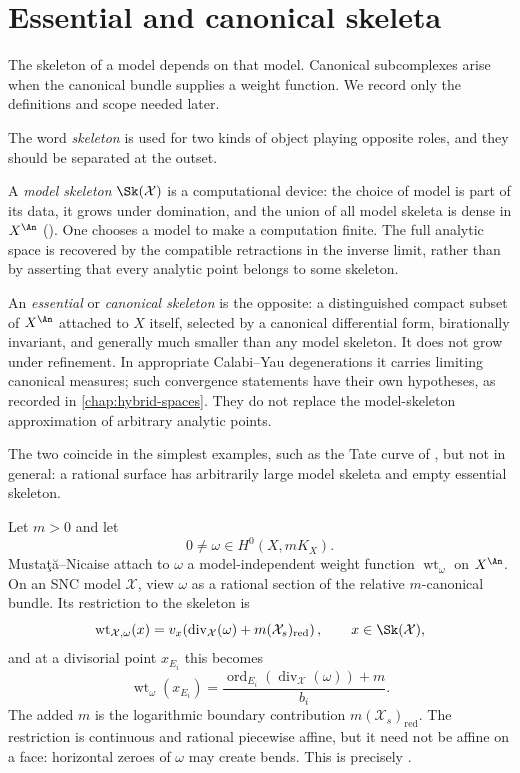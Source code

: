 \section{Essential and canonical skeleta}
\label{sec:essential-skeleton}

The skeleton of a model depends on that model. Canonical subcomplexes arise
when the canonical bundle supplies a weight function. We record only the
definitions and scope needed later.

The word \emph{skeleton} is used for two kinds of object playing opposite
roles, and they should be separated at the outset.

A \emph{model skeleton} $\Sk(\mathcal X)$ is a computational device:
the choice of model is part of its data, it grows under domination, and
the union of all model skeleta is dense in $X^{\An}$
(). One chooses a model to make a
computation finite. The full analytic space is recovered by the compatible
retractions in the inverse limit, rather than by asserting that every
analytic point belongs to some skeleton.

An \emph{essential} or \emph{canonical skeleton} is the opposite: a
distinguished compact subset of $X^{\An}$ attached to $X$ itself,
selected by a canonical differential form, birationally invariant, and
generally much smaller than any model skeleton. It does not grow under
refinement. In appropriate Calabi--Yau degenerations it carries limiting
canonical measures; such convergence statements have their own hypotheses,
as recorded in \cref{chap:hybrid-spaces}. They do not replace the
model-skeleton approximation of arbitrary analytic points.

The two coincide in the simplest examples, such as the Tate curve of
, but not in general: a rational surface has
arbitrarily large model skeleta and empty essential skeleton.

Let $m>0$ and let
\[
              0\neq\omega\in H^0(X,mK_X).
\]
Musta\c{t}\u{a}--Nicaise attach to $\omega$ a model-independent weight
function $\operatorname{wt}_\omega$ on $X^{\An}$.  On an SNC model
$\mathcal X$, view $\omega$ as a rational section of the relative
$m$-canonical bundle.  Its restriction to the skeleton is
\[
 \operatorname{wt}_{\mathcal X,\omega}(x)
 =v_x\!\left(\operatorname{div}_{\mathcal X}(\omega)
              +m(\mathcal X_s)_{\mathrm{red}}\right),
 \qquad x\in\Sk(\mathcal X),
\]
and at a divisorial point $x_{E_i}$ this becomes
\[
 \operatorname{wt}_{\omega}(x_{E_i})
   =\frac{\operatorname{ord}_{E_i}
      (\operatorname{div}_{\mathcal X}(\omega))+m}{b_i}.
\]
The added $m$ is the logarithmic boundary contribution
$m(\mathcal X_s)_{\mathrm{red}}$.  The restriction is continuous and
rational piecewise affine, but it need not be affine on a face: horizontal
zeroes of $\omega$ may create bends.  This is precisely
\cite[Proposition~4.4.3]{MustataNicaise2015}.

